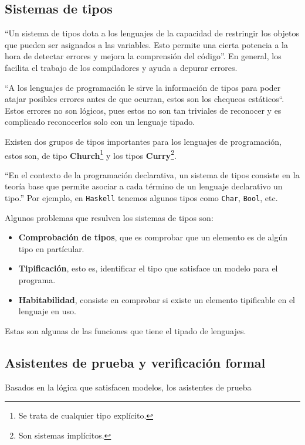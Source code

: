 \documentclass{article}
\newcommand{\code}[1]{\textcolor{white!25!black}{\texttt{#1}}}
\begin{document}
\subsection*{Sistemas de tipos}
``Un sistema de tipos dota a los lenguajes de la capacidad de restringir los objetos
que pueden ser asignados a las variables. Esto permite una cierta potencia a la hora de
detectar errores y mejora la comprensión del código''. En general, los facilita el trabajo
de los compiladores y ayuda a depurar errores.

``A los lenguajes de programación le sirve la información de tipos para poder
atajar posibles errores antes de que ocurran, estos son los chequeos estáticos``.
Estos errores no son lógicos, pues estos no son tan triviales de reconocer y es
complicado reconocerlos solo con un lenguaje tipado.

Existen dos grupos de tipos importantes para los lenguajes de programación, estos
son, de tipo \textbf{Church}\footnote{Se trata de cualquier tipo explícito.} y los
tipos \textbf{Curry}\footnote{Son sistemas implícitos.}.

``En el contexto de la programación declarativa, un sistema de tipos consiste en la
teoría base que permite asociar a cada término de un lenguaje declarativo un tipo.''
Por ejemplo, en \code{Haskell} tenemos algunos tipos como \code{Char}, \code{Bool},
etc.

Algunos problemas que resulven los sistemas de tipos son:
\newcommand{\localtextbulletone}{\textcolor{black}{\raisebox{.45ex}{\rule{.6ex}{.6ex}}}}
\renewcommand{\labelitemi}{\localtextbulletone}
\begin{itemize}
\item \textbf{Comprobación de tipos}, que es comprobar que un elemento es de algún tipo
  en partícular.
\item \textbf{Tipificación}, esto es, identificar el tipo que satisface un modelo para
  el programa.
\item \textbf{Habitabilidad}, consiste en comprobar si existe un elemento tipificable
  en el lenguaje en uso.
\end{itemize}
Estas son algunas de las funciones que tiene el tipado de lenguajes.

\subsection*{Asistentes de prueba y verificación formal}
Basados en la lógica que satisfacen modelos, los asistentes de prueba
\\

\printbibliography
\end{document}
